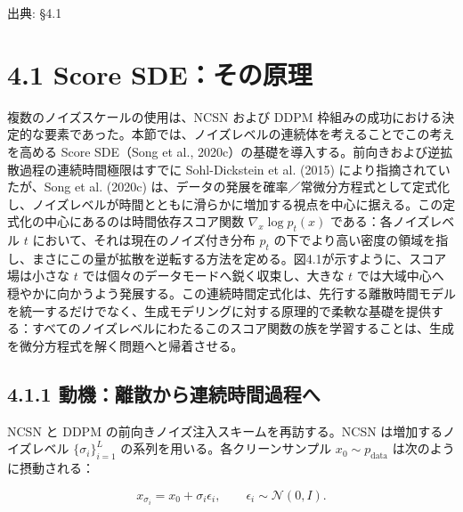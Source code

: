 

{\color{gray}\footnotesize 出典: §4.1\par}
\vspace{0.2em}

\section*{4.1 Score SDE：その原理}




複数のノイズスケールの使用は、NCSN および DDPM 枠組みの成功における決定的な要素であった。本節では、ノイズレベルの連続体を考えることでこの考えを高める Score SDE（Song et al., 2020c）の基礎を導入する。前向きおよび逆拡散過程の連続時間極限はすでに Sohl-Dickstein et al. (2015) により指摘されていたが、Song et al. (2020c) は、データの発展を確率／常微分方程式として定式化し、ノイズレベルが時間とともに滑らかに増加する視点を中心に据える。この定式化の中心にあるのは時間依存スコア関数 $\nabla_x\log p_t(x)$ である：各ノイズレベル $t$ において、それは現在のノイズ付き分布 $p_t$ の下でより高い密度の領域を指し、まさにこの量が拡散を逆転する方法を定める。図4.1が示すように、スコア場は小さな $t$ では個々のデータモードへ鋭く収束し、大きな $t$ では大域中心へ穏やかに向かうよう発展する。この連続時間定式化は、先行する離散時間モデルを統一するだけでなく、生成モデリングに対する原理的で柔軟な基礎を提供する：すべてのノイズレベルにわたるこのスコア関数の族を学習することは、生成を微分方程式を解く問題へと帰着させる。

\subsection*{4.1.1 動機：離散から連続時間過程へ}


NCSN と DDPM の前向きノイズ注入スキームを再訪する。NCSN は増加するノイズレベル $\{\sigma_i\}_{i=1}^{L}$ の系列を用いる。各クリーンサンプル $x_0\sim p_{\mathrm{data}}$ は次のように摂動される：

\[
x_{\sigma_i} = x_0 + \sigma_i\epsilon_i, \qquad \epsilon_i\sim\mathcal{N}(0,I).
\]


